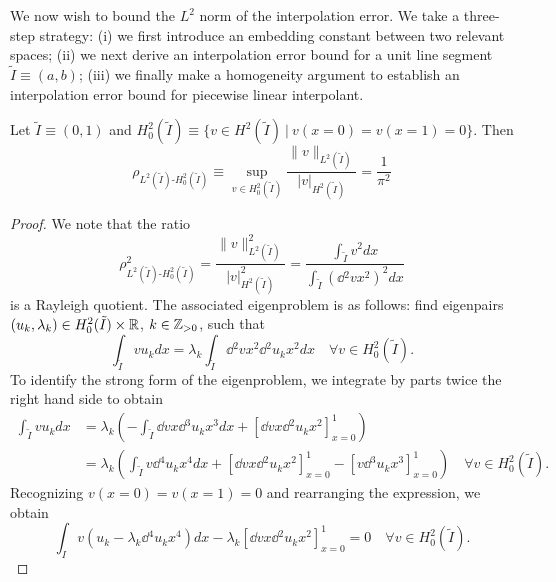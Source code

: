 We now wish to bound the $L^2$ norm of the interpolation error. We take a three-step strategy: (i) we first introduce an embedding constant between two relevant spaces; (ii) we next derive an interpolation error bound for a unit line segment $\tilde I \equiv (a,b)$; (iii) we finally make a homogeneity argument to establish an interpolation error bound for piecewise linear interpolant.
\begin{lemma}
  \label{lemma:th_l2_h2_embed}
  Let $\tilde I \equiv (0,1)$ and $H^2_0(\tilde I) \equiv \{ v \in H^2(\tilde I) \ | \ v(x=0) = v(x=1) = 0 \}$. Then 
  \begin{equation*}
    \rho_{L^2(\tilde I)\text{-}H^2_0(\tilde I)} \equiv \sup_{v \in H^2_0(\tilde I)} \frac{\| v \|_{L^2(\tilde I)}}{| v |_{H^2(\tilde I)}} = \frac{1}{\pi^2}
  \end{equation*}
  \begin{proof}
    We note that the ratio
    \begin{equation*}
       \rho_{L^2(\tilde I)\text{-}H^2_0(\tilde I)}^2 = \frac{\| v \|_{L^2(\tilde I)}^2}{|v|_{H^2(\tilde I)}^2}
      = \frac{\int_{\tilde I} v^2 dx}{\int_{\tilde I} (\dd{^2v}{x^2})^2 dx}
    \end{equation*}
    is a Rayleigh quotient.  The associated eigenproblem is as follows: find eigenpairs $(u_k, \lambda_k) \in H^2_0(\tilde I) \times \mathbb{R}$, $k \in \mathbb{Z}_{>0}$, such that
    \begin{equation*}
      \int_{\tilde I} v u_k dx = \lambda_k \int_{\tilde I} \dd{^2v}{x^2}\dd{^2u_k}{x^2}dx \quad \forall v \in H^2_0(\tilde I).
    \end{equation*}
    To identify the strong form of the eigenproblem, we integrate by parts twice the right hand side to obtain
    \begin{align*}
      \int_{\tilde I} v u_k dx
      &=
      \lambda_k \left( -\int_{\tilde I} \dd{v}{x} \dd{^3u_k}{x^3}dx  + [\dd{v}{x} \dd{^2u_k}{x^2}]_{x=0}^1 \right) %
      \\
      &=\lambda_k \left( \int_{\tilde I} v \dd{^4u_k}{x^4}dx  + [\dd{v}{x} \dd{^2u_k}{x^2}]_{x=0}^1 - [v \dd{^3u_k}{x^3}]_{x=0}^1 \right) \quad \forall v \in H^2_0(\tilde I).
    \end{align*}
    Recognizing $v(x=0) = v(x=1) = 0$ and rearranging the expression, we obtain
    \begin{equation*}
      \int_{I} v(u_k - \lambda_k \dd{^4u_k}{x^4}) dx - \lambda_k[\dd{v}{x} \dd{^2u_k}{x^2}]_{x=0}^1 = 0 \quad \forall v \in H^2_0(\tilde I).

\end{equation*}
\end{proof}
\end{lemma}
